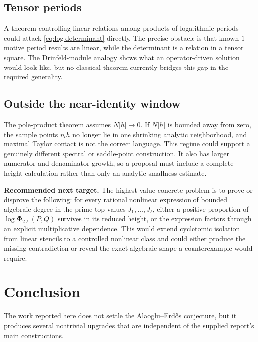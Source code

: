 \documentclass[11pt]{article}
\theoremstyle{definition}
\newcommand{\PhiHom}{\boldsymbol\Phi}
\begin{document}
\subsection{Tensor periods}

A theorem controlling linear relations among products of logarithmic periods
could attack \eqref{eq:log-determinant} directly.  The precise obstacle is
that known $1$-motive period results are linear, while the determinant is a
relation in a tensor square.  The Drinfeld-module analogy shows what an
operator-driven solution would look like, but no classical theorem currently
bridges this gap in the required generality.

\subsection{Outside the near-identity window}

The pole-product theorem assumes $N|h|\to0$.  If $N|h|$ is bounded away from
zero, the sample points $n_i h$ no longer lie in one shrinking analytic
neighborhood, and maximal Taylor contact is not the correct language.  This
regime could support a genuinely different spectral or saddle-point
construction.  It also has larger numerator and denominator growth, so a
proposal must include a complete height calculation rather than only an
analytic smallness estimate.

\begin{resultbox}
\textbf{Recommended next target.}
The highest-value concrete problem is to prove or disprove the following:
for every rational nonlinear expression of bounded algebraic degree in the
prime-top values $J_1,\ldots,J_\ell$, either a positive proportion of
$\log\PhiHom_{2\ell}(P,Q)$ survives in its reduced height, or the expression
factors through an explicit multiplicative dependence.  This would extend
cyclotomic isolation from linear stencils to a controlled nonlinear class and
could either produce the missing contradiction or reveal the exact algebraic
shape a counterexample would require.
\end{resultbox}

\section{Conclusion}

The work reported here does not settle the Alaoglu--Erd\H{o}s conjecture, but
it produces several nontrivial upgrades that are independent of the supplied
report's main constructions.
\end{document}
